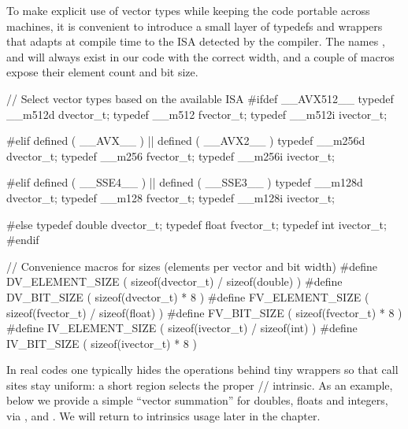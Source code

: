 \vspace{-1.5em}

To make explicit use of vector types while keeping the code portable across machines, it is convenient to introduce a small layer of typedefs and wrappers that adapts at compile time to the ISA detected by the compiler. The names ,  and  will always exist in our code with the correct width, and a couple of macros expose their element count and bit size.


\begin{codeblock}[language=C, basicstyle=\ttfamily\scriptsize]
// Select vector types based on the available ISA
#ifdef __AVX512__
typedef __m512d dvector_t;
typedef __m512  fvector_t;
typedef __m512i ivector_t;

#elif defined ( __AVX__ ) || defined ( __AVX2__ )
typedef __m256d dvector_t;
typedef __m256  fvector_t;
typedef __m256i ivector_t;

#elif defined ( __SSE4__ ) || defined ( __SSE3__ )
typedef __m128d dvector_t;
typedef __m128  fvector_t;
typedef __m128i ivector_t;

#else
typedef double dvector_t;
typedef float  fvector_t;
typedef int    ivector_t;
#endif

// Convenience macros for sizes (elements per vector and bit width)
#define DV_ELEMENT_SIZE ( sizeof(dvector_t) / sizeof(double) )
#define DV_BIT_SIZE     ( sizeof(dvector_t) * 8 )
#define FV_ELEMENT_SIZE ( sizeof(fvector_t) / sizeof(float) )
#define FV_BIT_SIZE     ( sizeof(fvector_t) * 8 )
#define IV_ELEMENT_SIZE ( sizeof(ivector_t) / sizeof(int) )
#define IV_BIT_SIZE     ( sizeof(ivector_t) * 8 )
\end{codeblock}

In real codes one typically hides the operations behind tiny wrappers so that call sites stay uniform: a short  region selects the proper // intrinsic. As an example, below we provide a simple ``vector summation'' for doubles, floats and integers, via ,  and . We will return to intrinsics usage later in the chapter.

